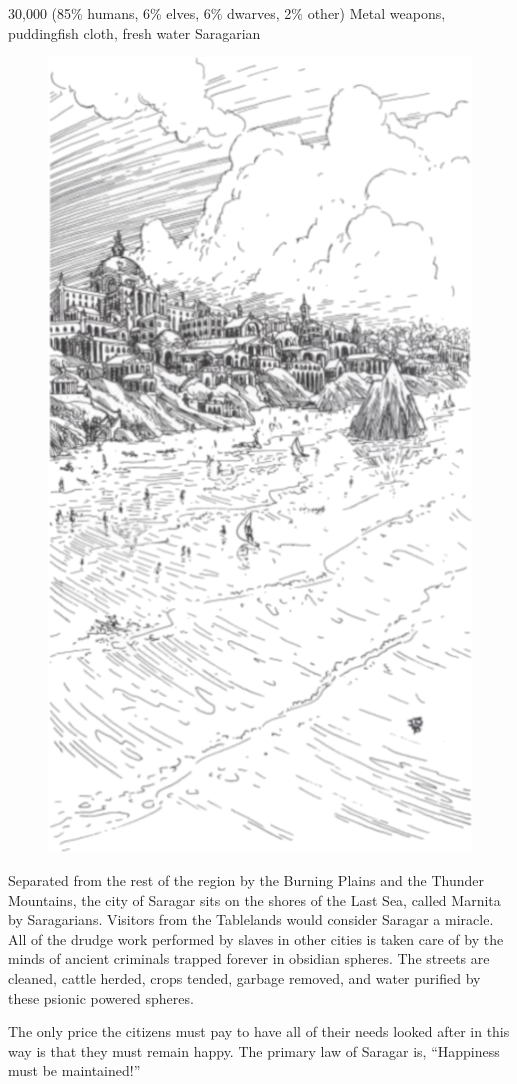 {30,000 (85\% humans, 6\% elves, 6\% dwarves, 2\% other)}
{Metal weapons, puddingfish cloth, fresh water}
{Saragarian}
{
\begin{figure}[b!]
\centering
\includegraphics[width=\columnwidth]{images/saragar-1.png}
\end{figure}

	Separated from the rest of the region by the Burning Plains and the Thunder Mountains, the city of Saragar sits on the shores of the Last Sea, called Marnita by Saragarians. Visitors from the Tablelands would consider Saragar a miracle. All of the drudge work performed by slaves in other cities is taken care of by the minds of ancient criminals trapped forever in obsidian spheres. The streets are cleaned, cattle herded, crops tended, garbage removed, and water purified by these psionic powered spheres.

	The only price the citizens must pay to have all of their needs looked after in this way is that they must remain happy. The primary law of Saragar is, ``Happiness must be maintained!''
}
